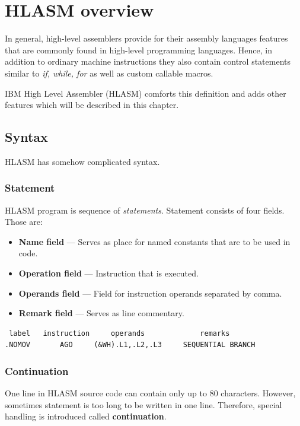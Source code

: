 \chapter{HLASM overview}

In general, high-level assemblers provide for their assembly languages features that are commonly found in high-level programming languages. Hence, in addition to ordinary machine instructions they also contain control statements similar to \textit{if, while, for} as well as custom callable macros.

IBM High Level Assembler (HLASM) comforts this definition and adds other features which will be described in this chapter.

\section{Syntax}

HLASM has somehow complicated syntax.

\subsection{Statement}

HLASM program is sequence of \textit{statements}. Statement consists of four fields. Those are:
\begin{itemize}
	\item \textbf{Name field} --- Serves as place for named constants that are to be used in code.
	
	\item \textbf{Operation field} --- Instruction that is executed.
	
	\item \textbf{Operands field} --- Field for instruction operands separated by comma.
	
	\item \textbf{Remark field} --- Serves as line commentary.
\end{itemize}

\begin{verbatim}
 label   instruction     operands             remarks
.NOMOV       AGO     (&WH).L1,.L2,.L3     SEQUENTIAL BRANCH
\end{verbatim}

\subsection{Continuation}

One line in HLASM source code can contain only up to 80 characters. However, sometimes statement is too long to be written in one line. Therefore, special handling is introduced called \textbf{continuation}.

